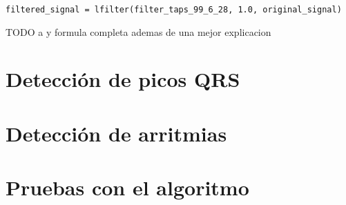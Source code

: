 \lstset{language=python, breaklines=true, basicstyle=\footnotesize}
\begin{lstlisting}[frame=single]
    filtered_signal = lfilter(filter_taps_99_6_28, 1.0, original_signal)
\end{lstlisting}
TODO a y formula completa ademas de una mejor explicacion

\section{Detección de picos QRS}



\section{Detección de arritmias}

\section{Pruebas con el algoritmo}

